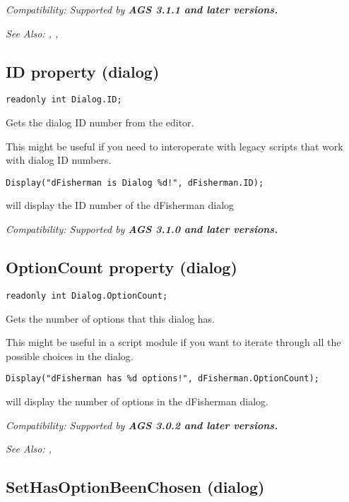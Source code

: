 \it{Compatibility:} Supported by \bf{AGS 3.1.1} and later versions.

\it{See Also:} ,
,


\subsection{ID property (dialog)}\label{Dialog.ID}%

\begin{verbatim}
readonly int Dialog.ID;
\end{verbatim}
Gets the dialog ID number from the editor.

This might be useful if you need to interoperate with legacy scripts
that work with dialog ID numbers.

\begin{verbatim}
Display("dFisherman is Dialog %d!", dFisherman.ID);
\end{verbatim}
will display the ID number of the dFisherman dialog

\it{Compatibility:} Supported by \bf{AGS 3.1.0} and later versions.


\subsection{OptionCount property (dialog)}\label{Dialog.OptionCount}%

\begin{verbatim}
readonly int Dialog.OptionCount;
\end{verbatim}
Gets the number of options that this dialog has.

This might be useful in a script module if you want to iterate through all
the possible choices in the dialog.

\begin{verbatim}
Display("dFisherman has %d options!", dFisherman.OptionCount);
\end{verbatim}
will display the number of options in the dFisherman dialog.

\it{Compatibility:} Supported by \bf{AGS 3.0.2} and later versions.

\it{See Also:} ,

\subsection{SetHasOptionBeenChosen (dialog)}\label{Dialog.SetHasOptionBeenChosen}%

